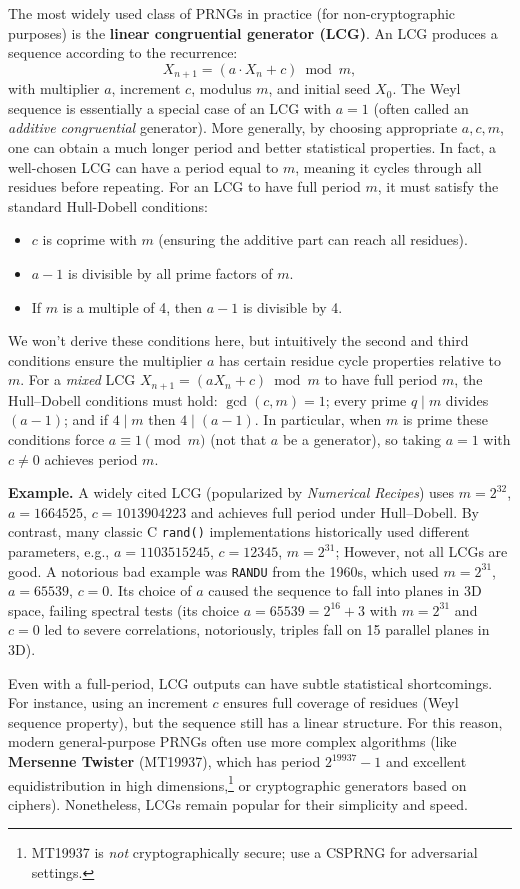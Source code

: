 \documentclass[11pt]{article}
\begin{document}
The most widely used class of PRNGs in practice (for non-cryptographic purposes) is the \textbf{linear congruential generator (LCG)}. An LCG produces a sequence according to the recurrence:
\[ X_{n+1} = (a \cdot X_n + c) \bmod m, \]
with multiplier $a$, increment $c$, modulus $m$, and initial seed $X_0$. The Weyl sequence is essentially a special case of an LCG with $a=1$ (often called an \emph{additive congruential} generator). More generally, by choosing appropriate $a, c, m$, one can obtain a much longer period and better statistical properties. In fact, a well-chosen LCG can have a period equal to $m$, meaning it cycles through all residues before repeating. For an LCG to have full period $m$, it must satisfy the standard Hull-Dobell conditions:
\begin{itemize}
  \item $c$ is coprime with $m$ (ensuring the additive part can reach all residues).
  \item $a-1$ is divisible by all prime factors of $m$.
  \item If $m$ is a multiple of 4, then $a-1$ is divisible by 4.
\end{itemize}
We won’t derive these conditions here, but intuitively the second and third conditions ensure the multiplier $a$ has certain residue cycle properties relative to $m$. For a \emph{mixed} LCG $X_{n+1}=(aX_n+c)\bmod m$ to have full period $m$, the Hull–Dobell conditions must hold: $\gcd(c,m)=1$; every prime $q\mid m$ divides $(a-1)$; and if $4\mid m$ then $4\mid(a-1)$. In particular, when $m$ is prime these conditions force $a\equiv 1\pmod m$ (not that $a$ be a generator), so taking $a=1$ with $c\neq 0$ achieves period $m$.

\textbf{Example.} A widely cited LCG (popularized by \emph{Numerical Recipes}) uses $m=2^{32}$, $a=1664525$, $c=1013904223$ and achieves full period under Hull–Dobell. By contrast, many classic C \texttt{rand()} implementations historically used different parameters, e.g., $a=1103515245$, $c=12345$, $m=2^{31}$; However, not all LCGs are good. A notorious bad example was \texttt{RANDU} from the 1960s, which used $m=2^{31}$, $a=65539$, $c=0$. Its choice of $a$ caused the sequence to fall into planes in 3D space, failing spectral tests (its choice $a=65539=2^{16}+3$ with $m=2^{31}$ and $c=0$ led to severe correlations, notoriously, triples fall on 15 parallel planes in 3D).

Even with a full-period, LCG outputs can have subtle statistical shortcomings. For instance, using an increment $c$ ensures full coverage of residues (Weyl sequence property), but the sequence still has a linear structure. For this reason, modern general-purpose PRNGs often use more complex algorithms (like \textbf{Mersenne Twister} (MT19937), which has period $2^{19937}-1$ and excellent equidistribution in high dimensions,\footnote{MT19937 is \emph{not} cryptographically secure; use a CSPRNG for adversarial settings.} or cryptographic generators based on ciphers). Nonetheless, LCGs remain popular for their simplicity and speed. 
\end{document}
